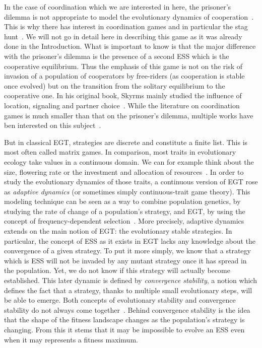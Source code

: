     In the case of coordination which we are interested in here, the prisoner's dilemma is not appropriate to model the evolutionary dynamics of cooperation~\parencite{Alvard2002, Skyrms2004}. This is why there has interest in coordination games and in particular the stag hunt~\parencite{Skyrms2004, Requejo2013a}. We will not go in detail here in describing this game as it was already done in the Introduction. What is important to know is that the major difference with the prisoner's dilemma is the presence of a second ESS which is the cooperative equilibrium. Thus the emphasis of this game is not on the risk of invasion of a population of cooperators by free-riders (as cooperation is stable once evolved) but on the transition from the solitary equilibrium to the cooperative one. In his original book, Skyrms mainly studied the influence of location, signaling and partner choice~\parencite{Skyrms2004}. While the literature on coordination games is much smaller than that on the prisoner's dilemma, multiple works have ben interested on this subject~\parencite{Santos2006, Pacheco2009, Iyer2016}.


    But in classical EGT, strategies are discrete and constitute a finite list. This is most often called matrix games. In comparison, most traits in evolutionary ecology take values in a continuous domain. We can for example think about the size, flowering rate or the investment and allocation of resources~\parencite{McGill2007}. In order to study the evolutionary dynamics of those traits, a continuous version of EGT rose as \emph{adaptive dynamics} (or sometimes simply continuous-trait game theory). This modeling technique can be seen as a way to combine population genetics, by studying the rate of change of a population's strategy, and EGT, by using the concept of frequency-dependent selection~\parencite{Geritz1998, McGill2007}. More precisely, adaptive dynamics extends on the main notion of EGT: the evolutionary stable strategies. In particular, the concept of ESS as it exists in EGT lacks any knowledge about the convergence of a given strategy. To put it more simply, we know that a strategy which is ESS will not be invaded by any mutant strategy once it has spread in the population. Yet, we do not know if this strategy will actually become established. This later dynamic is defined by \emph{convergence stability}, a notion which defines the fact that a strategy, thanks to multiple small evolutionary steps, will be able to emerge. Both concepts of evolutionary stability and convergence stability do not always come together~\parencite{Eshel1981, Eshel1983}. Behind convergence stability is the idea that the shape of the fitness landscape changes as the population's strategy is changing. From this it stems that it may be impossible to evolve an ESS even when it may represents a fitness maximum.

